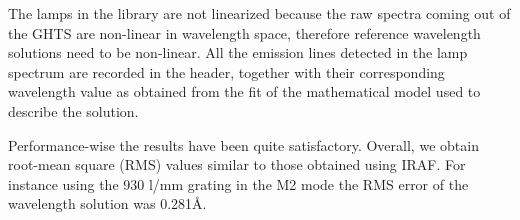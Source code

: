 \documentclass[11pt,twoside]{article}
\begin{document}
The lamps in the library are not linearized because the raw spectra coming out of the GHTS are non-linear in wavelength space, therefore reference wavelength solutions need to be non-linear. All the emission lines detected in the lamp spectrum are recorded in the header, together with their corresponding wavelength value as obtained from the fit of the mathematical model used to describe the solution. 

Performance-wise the results have been quite satisfactory. 
Overall, we obtain root-mean square (RMS) values similar to those obtained  using IRAF. For instance using the 930 l/mm grating in the M2 mode the RMS error of the wavelength solution was 0.281\AA.
\end{document}

